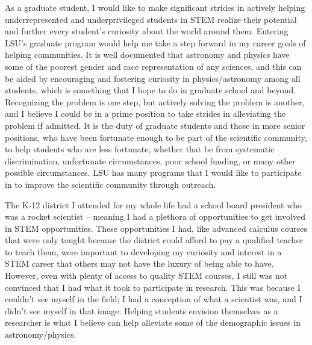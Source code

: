 \documentclass[12pt,letterpaper]{article}
\begin{document}
As a graduate student, I would like to make signiﬁcant strides in actively helping underrepresented and underprivileged students in STEM realize their potential and further every student’s curiosity about the world around them. Entering LSU's graduate program would help me take a step forward in my career goals of helping communities. It is well documented that astronomy and physics have some of the poorest gender and race representation of any sciences, and this can be aided by encouraging and fostering curiosity in physics/astronomy among all students, which is something that I hope to do in graduate school and beyond. Recognizing the problem is one step, but actively solving the problem is another, and I believe I could be in a prime position to take strides in alleviating the problem if admitted. It is the duty of graduate students and those in more senior positions, who have been fortunate enough to be part of the scientiﬁc community, to help students who are less fortunate, whether that be from systematic discrimination, unfortunate circumstances, poor school funding, or many other possible circumstances. LSU has many programs that I would like to participate in to improve the scientific community through outreach. 

The K-12 district I attended for my whole life had a school board president who was a rocket scientist -- meaning I had a plethora of opportunities to get involved in STEM opportunities. These opportunities I had, like advanced calculus courses that were only taught because the district could afford to pay a qualified teacher to teach them, were important to developing my curiosity and interest in a STEM career that others may not have the luxury of being able to have. However, even with plenty of access to quality STEM courses, I still was not convinced that I had what it took to participate in research. This was because I couldn't see myself in the field; I had a conception of what a scientist was, and I didn't see myself in that image. Helping students envision themselves as a researcher is what I believe can help alleviate some of the demographic issues in astronomy/physics.
\end{document}

